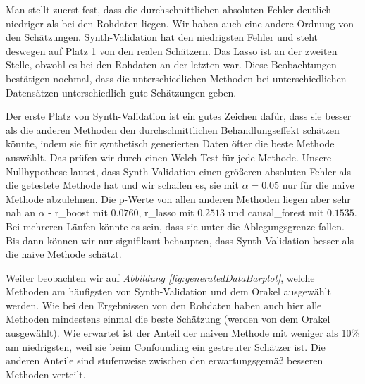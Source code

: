 \documentclass[12pt,a4paper,twoside]{scrartcl}
\numberwithin{equation}{section}
\newcommand{\reffig}[1]{\emph{\hyperref[#1]{Abbildung \ref*{#1}}}}
\begin{document}
\noindent
Man stellt zuerst fest, dass die durchschnittlichen absoluten Fehler deutlich niedriger als bei den Rohdaten liegen. Wir haben auch eine andere Ordnung von den Schätzungen. Synth-Validation hat den niedrigsten Fehler und steht deswegen auf Platz 1 von den realen Schätzern. Das Lasso ist an der zweiten Stelle, obwohl es bei den Rohdaten an der letzten war. Diese Beobachtungen bestätigen nochmal, dass die unterschiedlichen Methoden bei unterschiedlichen Datensätzen unterschiedlich gute Schätzungen geben.\par

\noindent
Der erste Platz von Synth-Validation ist ein gutes Zeichen dafür, dass sie besser als die anderen Methoden den durchschnittlichen Behandlungseffekt schätzen könnte, indem sie für synthetisch generierten Daten öfter die beste Methode auswählt. Das prüfen wir durch einen Welch Test für jede Methode. Unsere Nullhypothese lautet, dass Synth-Validation einen größeren absoluten Fehler als die getestete Methode hat und wir schaffen es, sie  mit $\alpha = 0.05$ nur für die naive Methode abzulehnen. Die p-Werte von allen anderen Methoden liegen aber sehr nah an $\alpha$ - r\_boost mit $0.0760$, r\_lasso mit $0.2513$ und causal\_forest mit $0.1535$. Bei mehreren Läufen könnte es sein, dass sie unter die Ablegungsgrenze fallen. Bis dann können wir nur signifikant behaupten, dass Synth-Validation besser als die naive Methode schätzt.\par

\noindent
Weiter beobachten wir auf \reffig{fig:generatedDataBarplot}, welche Methoden am häufigsten von Synth-Validation und dem Orakel ausgewählt werden. Wie bei den Ergebnissen von den Rohdaten haben auch hier alle Methoden mindestens einmal die beste Schätzung (werden von dem Orakel ausgewählt). Wie erwartet ist der Anteil der naiven Methode mit weniger als 10\% am niedrigsten, weil sie beim Confounding ein gestreuter Schätzer ist. Die anderen Anteile sind stufenweise zwischen den erwartungsgemäß besseren Methoden verteilt.\par 
\end{document}
